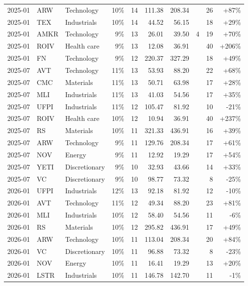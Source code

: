 \documentclass[11pt,a4paper]{article}
\begin{document}
{\begin{longtable}{l l l r r r r r r r}
2025-01 & ARW & Technology & 10\% & 14 & 111.38 & 208.34 &  & 26 & +87\% \\
2025-01 & TEX & Industrials & 10\% & 14 & 44.52 & 56.15 &  & 18 & +29\% \\
2025-01 & AMKR & Technology & 9\% & 13 & 26.01 & 39.50 & 4 & 19 & +70\% \\
2025-01 & ROIV & Health care & 9\% & 13 & 12.08 & 36.91 &  & 40 & +206\% \\
2025-01 & FN & Technology & 9\% & 12 & 220.37 & 327.29 &  & 18 & +49\% \\
2025-07 & AVT & Technology & 11\% & 13 & 53.93 & 88.20 &  & 22 & +68\% \\
2025-07 & CMC & Materials & 11\% & 13 & 50.71 & 63.98 &  & 17 & +28\% \\
2025-07 & MLI & Industrials & 11\% & 13 & 41.03 & 54.56 &  & 17 & +35\% \\
2025-07 & UFPI & Industrials & 11\% & 12 & 105.47 & 81.92 &  & 10 & -21\% \\
2025-07 & ROIV & Health care & 10\% & 12 & 10.94 & 36.91 &  & 40 & +237\% \\
2025-07 & RS & Materials & 10\% & 11 & 321.33 & 436.91 &  & 16 & +39\% \\
2025-07 & ARW & Technology & 9\% & 11 & 129.76 & 208.34 &  & 17 & +61\% \\
2025-07 & NOV & Energy & 9\% & 11 & 12.92 & 19.29 &  & 17 & +54\% \\
2025-07 & YETI & Discretionary & 9\% & 10 & 32.93 & 43.66 &  & 14 & +33\% \\
2025-07 & VC & Discretionary & 9\% & 10 & 98.77 & 73.32 &  & 8 & -25\% \\
2026-01 & UFPI & Industrials & 12\% & 13 & 92.18 & 81.92 &  & 12 & -10\% \\
2026-01 & AVT & Technology & 11\% & 12 & 49.34 & 88.20 &  & 23 & +81\% \\
2026-01 & MLI & Industrials & 10\% & 12 & 58.40 & 54.56 &  & 11 & -6\% \\
2026-01 & RS & Materials & 10\% & 12 & 295.82 & 436.91 &  & 17 & +49\% \\
2026-01 & ARW & Technology & 10\% & 11 & 113.04 & 208.34 &  & 20 & +84\% \\
2026-01 & VC & Discretionary & 10\% & 11 & 96.88 & 73.32 &  & 8 & -23\% \\
2026-01 & NOV & Energy & 10\% & 11 & 16.41 & 19.29 &  & 13 & +20\% \\
2026-01 & LSTR & Industrials & 10\% & 11 & 146.78 & 142.70 &  & 11 & -1\% \\

\end{longtable}}
\end{document}
